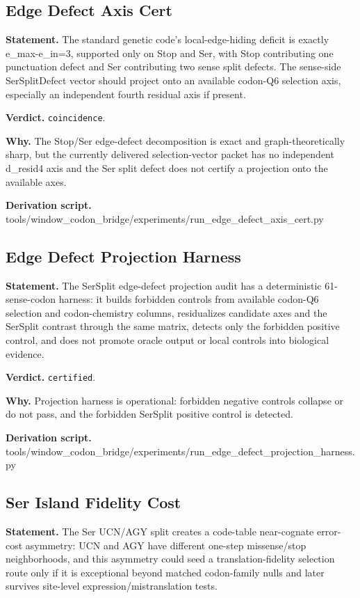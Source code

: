 \subsection{Edge Defect Axis Cert}\label{sec:bridge-edge-defect-axis-cert}
\textbf{Statement.} The standard genetic code's local-edge-hiding deficit is exactly e\_max-e\_in=3, supported only on
Stop and Ser, with Stop contributing one punctuation defect and Ser contributing two sense split
defects. The sense-side SerSplitDefect vector should project onto an available codon-Q6 selection
axis, especially an independent fourth residual axis if present.

\textbf{Verdict.} \texttt{coincidence}.

\textbf{Why.} The Stop/Ser edge-defect decomposition is exact and graph-theoretically sharp, but the currently
delivered selection-vector packet has no independent d\_resid4 axis and the Ser split defect does
not certify a projection onto the available axes.

\textbf{Derivation script.} tools/window\_codon\_bridge/experiments/run\_edge\_defect\_axis\_cert.py

\subsection{Edge Defect Projection Harness}\label{sec:bridge-edge-defect-projection-harness}
\textbf{Statement.} The SerSplit edge-defect projection audit has a deterministic 61-sense-codon harness: it builds
forbidden controls from available codon-Q6 selection and codon-chemistry columns, residualizes
candidate axes and the SerSplit contrast through the same matrix, detects only the forbidden
positive control, and does not promote oracle output or local controls into biological evidence.

\textbf{Verdict.} \texttt{certified}.

\textbf{Why.} Projection harness is operational: forbidden negative controls collapse or do not pass, and the
forbidden SerSplit positive control is detected.

\textbf{Derivation script.} tools/window\_codon\_bridge/experiments/run\_edge\_defect\_projection\_harness.py

\subsection{Ser Island Fidelity Cost}\label{sec:bridge-ser-island-fidelity-cost}
\textbf{Statement.} The Ser UCN/AGY split creates a code-table near-cognate error-cost asymmetry: UCN and AGY have
different one-step missense/stop neighborhoods, and this asymmetry could seed a translation-fidelity
selection route only if it is exceptional beyond matched codon-family nulls and later survives
site-level expression/mistranslation tests.

